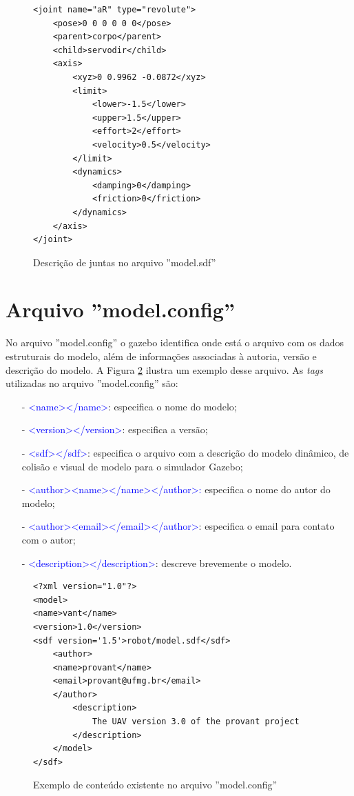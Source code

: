 \begin{figure}[ht!]
\begin{verbatim}
<joint name="aR" type="revolute">
	<pose>0 0 0 0 0 0</pose>
	<parent>corpo</parent>
	<child>servodir</child>
	<axis>
		<xyz>0 0.9962 -0.0872</xyz>
		<limit>
			<lower>-1.5</lower>
			<upper>1.5</upper>
			<effort>2</effort>
			<velocity>0.5</velocity>
		</limit>
		<dynamics>
			<damping>0</damping>
			<friction>0</friction>
		</dynamics>
	</axis>
</joint>
\end{verbatim}
\vspace{-0.8cm}
\caption{Descrição de juntas no arquivo ''model.sdf''}
\label{joint}
\end{figure}

\section{Arquivo ''model.config''}

No arquivo ''model.config'' o gazebo identifica onde está o arquivo com os dados estruturais do modelo, além de informações associadas à autoria, versão e descrição do modelo. A Figura \ref{model.config} ilustra um exemplo desse arquivo. As \textit{tags} utilizadas no arquivo ''model.config'' são:
\small
\begin{itemize}
\setlength{\itemsep}{1pt}
\setlength{\parskip}{0pt}
\setlength{\parsep}{0pt}
\item[-] \textcolor{blue}{<name></name>}: especifica o nome do modelo;
\item[-] \textcolor{blue}{<version></version>}: especifica a versão;
\item[-] \textcolor{blue}{<sdf></sdf>}: especifica o arquivo com a descrição do modelo dinâmico, de colisão e visual de modelo para o simulador Gazebo;
\item[-] \textcolor{blue}{<author><name></name></author>}\textcolor{blue}: especifica o nome do autor do modelo;
\item[-] \textcolor{blue}{<author><email></email></author>}: especifica o email para contato com o autor;
\item[-] \textcolor{blue}{<description></description>}: descreve brevemente o modelo.
\end{itemize}\normalsize

\begin{figure}[ht!]
\begin{verbatim}
<?xml version="1.0"?>
<model>
<name>vant</name>
<version>1.0</version>
<sdf version='1.5'>robot/model.sdf</sdf>
	<author>
	<name>provant</name>
	<email>provant@ufmg.br</email>
	</author>
		<description>
			The UAV version 3.0 of the provant project 
		</description>
	</model>
</sdf>
\end{verbatim}
\vspace{-0.8cm}
\caption{Exemplo de conteúdo existente no arquivo ''model.config''}
\label{model.config}
\end{figure}


